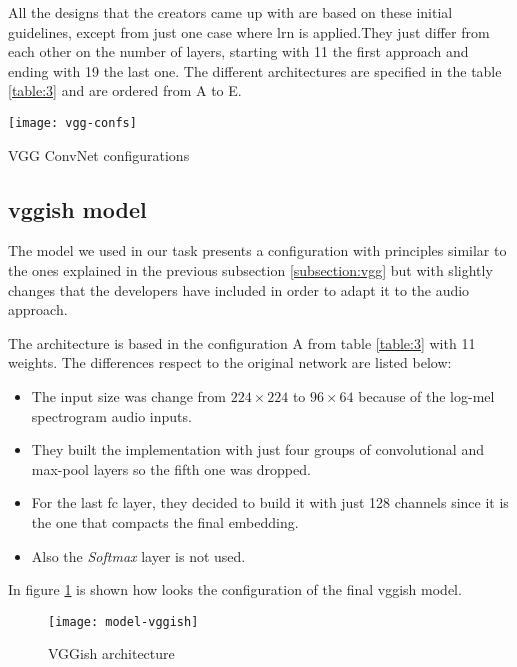 	All the designs that the creators came up with are based on these initial guidelines, except from just one case where \acrfull{lrn} is applied.They just differ from each other on the number of layers, starting with 11 the first approach and ending with 19 the last one. The different architectures are specified in the table \ref{table:3} and are ordered from A to E.
	
	\begin{table}[t!]
		\begin{center}
		\captionsetup{justification=centering}
		\texttt{[image: vgg-confs]}
		\caption{VGG ConvNet configurations}
		\label{table:3}
		\end{center}
	\end{table}


\subsection{\acrshort{vgg}ish model}
\label{subsection:vggish}
	
	The model we used in our task presents a configuration with principles similar to the ones explained in the previous subsection \ref{subsection:vgg} but with slightly changes that the developers have included in order to adapt it to the audio approach.
	
	The architecture is based in the configuration A from table \ref{table:3} with 11 weights. The differences respect to the original network are listed below: 
	\begin{itemize}
		\item The input size was change from $224 \times 224$ to $96 \times 64$ because of the log-mel spectrogram audio inputs.
		\item They built the implementation with just four groups of convolutional and max-pool layers so the fifth one was dropped.
		\item For the last \acrshort{fc} layer, they decided to build it with just 128 channels since it is the one that compacts the final embedding.
		\item Also the \textit{Softmax} layer is not used.
	\end{itemize}
	In figure \ref{fig:mesh2} is shown how looks the configuration of the final \acrshort{vgg}ish model.
	
	\begin{figure}
		\centering
		\captionsetup{justification=centering}
		\texttt{[image: model-vggish]}
		\caption{VGGish architecture}
		\label{fig:mesh2}
	\end{figure}

